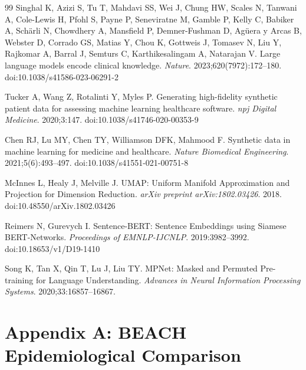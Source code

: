 \documentclass[11pt]{article}
\begin{document}
\begin{thebibliography}{99}
Singhal K, Azizi S, Tu T, Mahdavi SS, Wei J, Chung HW, Scales N, Tanwani A, Cole-Lewis H, Pfohl S, Payne P, Seneviratne M, Gamble P, Kelly C, Babiker A, Schärli N, Chowdhery A, Mansfield P, Demner-Fushman D, Agüera y Arcas B, Webster D, Corrado GS, Matias Y, Chou K, Gottweis J, Tomasev N, Liu Y, Rajkomar A, Barral J, Semturs C, Karthikesalingam A, Natarajan V.
Large language models encode clinical knowledge.
\textit{Nature}. 2023;620(7972):172--180.
doi:10.1038/s41586-023-06291-2

Tucker A, Wang Z, Rotalinti Y, Myles P.
Generating high-fidelity synthetic patient data for assessing machine learning healthcare software.
\textit{npj Digital Medicine}. 2020;3:147.
doi:10.1038/s41746-020-00353-9

Chen RJ, Lu MY, Chen TY, Williamson DFK, Mahmood F.
Synthetic data in machine learning for medicine and healthcare.
\textit{Nature Biomedical Engineering}. 2021;5(6):493--497.
doi:10.1038/s41551-021-00751-8

McInnes L, Healy J, Melville J.
UMAP: Uniform Manifold Approximation and Projection for Dimension Reduction.
\textit{arXiv preprint arXiv:1802.03426}. 2018.
doi:10.48550/arXiv.1802.03426

Reimers N, Gurevych I.
Sentence-BERT: Sentence Embeddings using Siamese BERT-Networks.
\textit{Proceedings of EMNLP-IJCNLP}. 2019:3982--3992.
doi:10.18653/v1/D19-1410

Song K, Tan X, Qin T, Lu J, Liu TY.
MPNet: Masked and Permuted Pre-training for Language Understanding.
\textit{Advances in Neural Information Processing Systems}. 2020;33:16857--16867.

\end{thebibliography}

\clearpage

\appendix

\section{Appendix A: BEACH Epidemiological Comparison}
\end{document}
